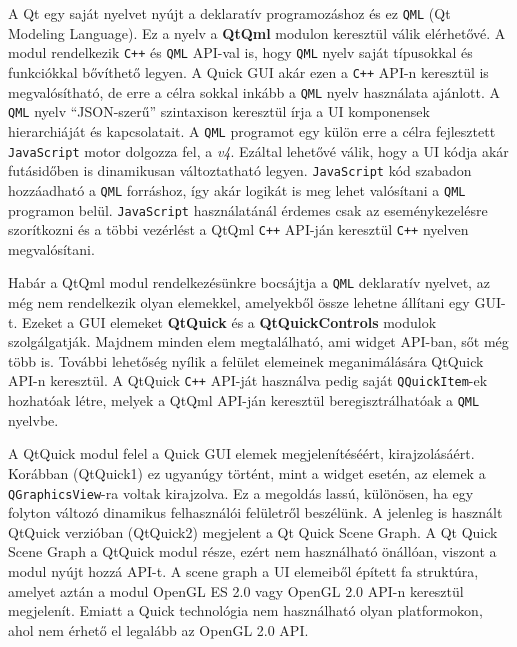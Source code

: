 \documentclass[12pt]{report}
\begin{document}
A Qt egy saját nyelvet nyújt a deklaratív programozáshoz és ez \texttt{QML} (Qt Modeling
Language). Ez a nyelv a \textbf{QtQml} modulon keresztül válik elérhetővé.
A modul rendelkezik \texttt{C++} és \texttt{QML} API-val is, hogy \texttt{QML} nyelv saját
típusokkal és  funkciókkal bővíthető legyen.
A Quick GUI akár ezen a \texttt{C++} API-n keresztül is megvalósítható, de erre a célra
sokkal inkább a \texttt{QML} nyelv használata ajánlott.
A \texttt{QML} nyelv ``JSON-szerű'' szintaxison keresztül írja a UI komponensek
hierarchiáját és kapcsolatait. A \texttt{QML} programot egy külön erre a célra fejlesztett
\texttt{JavaScript} motor dolgozza fel, a \textit{v4}. Ezáltal lehetővé válik, hogy a
UI kódja akár futásidőben is dinamikusan változtatható legyen. \texttt{JavaScript}
kód szabadon hozzáadható a \texttt{QML} forráshoz, így akár logikát is meg lehet valósítani a
\texttt{QML} programon belül. \texttt{JavaScript} használatánál érdemes csak az
eseménykezelésre szorítkozni és a többi vezérlést a QtQml \texttt{C++} API-ján keresztül
\texttt{C++} nyelven megvalósítani.
\cite{bib:qt-doc-qt-qml}

Habár a QtQml modul rendelkezésünkre bocsájtja a \texttt{QML} deklaratív nyelvet, az még
nem rendelkezik olyan elemekkel, amelyekből össze lehetne állítani egy GUI-t. Ezeket a
GUI elemeket \textbf{QtQuick} és a \textbf{QtQuickControls} modulok szolgálgatják.
Majdnem minden elem megtalálható, ami widget API-ban, sőt még több is. További lehetőség
nyílik a felület elemeinek meganimálására QtQuick API-n keresztül.
A QtQuick \texttt{C++} API-ját használva pedig saját \texttt{QQuickItem}-ek hozhatóak létre,
melyek a QtQml API-ján keresztül beregisztrálhatóak a \texttt{QML} nyelvbe.
\cite{bib:qt-doc-qt-quick}

A QtQuick modul felel a Quick GUI elemek megjelenítéséért, kirajzolásáért.
Korábban (QtQuick1) ez ugyanúgy történt, mint a widget esetén, az elemek a \\
\texttt{QGraphicsView}-ra voltak kirajzolva. Ez a megoldás lassú, különösen, ha egy folyton
változó dinamikus felhasználói felületről beszélünk. A jelenleg is használt QtQuick verzióban
(QtQuick2) megjelent a Qt Quick Scene Graph. A Qt Quick Scene Graph a QtQuick modul része,
ezért nem használható önállóan, viszont a modul nyújt hozzá API-t. A scene graph a UI
elemeiből épített fa struktúra, amelyet aztán a modul OpenGL ES 2.0 vagy OpenGL 2.0
API-n keresztül megjelenít. Emiatt a Quick technológia nem használható olyan platformokon,
ahol nem érhető el legalább az OpenGL 2.0 API.
\cite{bib:qt-doc-qt-quick-scene-graph}
\end{document}

